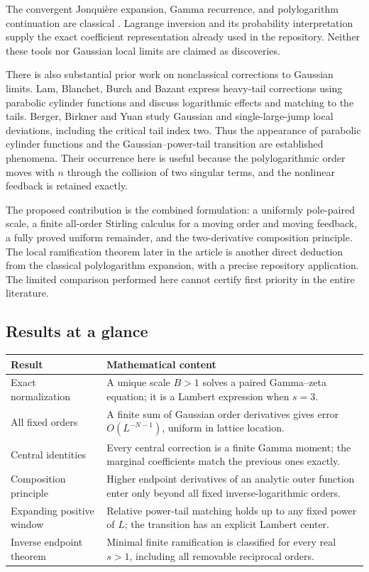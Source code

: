 The convergent Jonqui\`ere expansion, Gamma recurrence, and
polylogarithm continuation are classical \cite{dlmf-polylog}.
Lagrange inversion and its probability interpretation supply the exact
coefficient representation already used in the repository. Neither
these tools nor Gaussian local limits are claimed as discoveries.

There is also substantial prior work on nonclassical corrections to
Gaussian limits. Lam, Blanchet, Burch and Bazant \cite{lam}
express heavy-tail corrections using parabolic cylinder functions and
discuss logarithmic effects and matching to the tails. Berger, Birkner
and Yuan \cite{berger} study Gaussian and single-large-jump local
deviations, including the critical tail index two. Thus the appearance
of parabolic cylinder functions and the Gaussian--power-tail transition
are established phenomena. Their occurrence here is useful because
the polylogarithmic order moves with $n$ through the collision of two
singular terms, and the nonlinear feedback is retained exactly.

The proposed contribution is the combined formulation: a uniformly
pole-paired scale, a finite all-order Stirling calculus for a moving
order and moving feedback, a fully proved uniform remainder, and the
two-derivative composition principle. The local ramification theorem
later in the article is another direct deduction from the classical
polylogarithm expansion, with a precise repository application. The
limited comparison performed here cannot certify first priority in
the entire literature.

\subsection{Results at a glance}

\begin{center}
\begin{tabular}{@{}>{\raggedright\arraybackslash}p{}>{\raggedright\arraybackslash}p{}@{}}
\toprule
Result & Mathematical content\\
\midrule
Exact normalization & A unique scale $B>1$ solves a paired
Gamma--zeta equation; it is a Lambert expression when $s=3$.\\
All fixed orders & A finite sum of Gaussian order derivatives gives
error $O(L^{-N-1})$, uniform in lattice location.\\
Central identities & Every central correction is a finite Gamma
moment; the marginal coefficients match the previous ones exactly.\\
Composition principle & Higher endpoint derivatives of an analytic
outer function enter only beyond all fixed inverse-logarithmic orders.\\
Expanding positive window & Relative power-tail matching holds up to
any fixed power of $L$; the transition has an explicit Lambert center.\\
Inverse endpoint theorem & Minimal finite ramification is classified
for every real $s>1$, including all removable reciprocal orders.\\
\bottomrule
\end{tabular}
\end{center}

